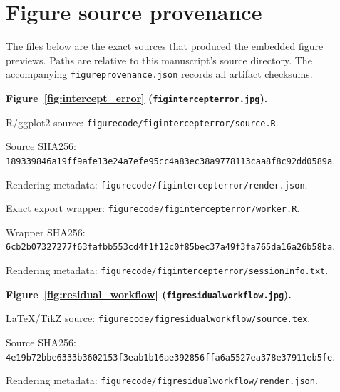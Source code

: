 \documentclass[11pt]{article}
\begin{document}
\section*{Figure source provenance}
The files below are the exact sources that produced the embedded figure previews. Paths are relative to this manuscript's source directory. The accompanying \texttt{figureprovenance.json} records all artifact checksums.\par
\medskip\noindent\textbf{Figure~\ref{fig:intercept_error} (\texttt{figintercepterror.jpg}).}\par
\noindent R/ggplot2 source: \texttt{figurecode/\allowbreak{}figintercepterror/\allowbreak{}source.R}.\par
\noindent Source SHA256: \texttt{18933984\allowbreak{}6a19ff9a\allowbreak{}fe13e24a\allowbreak{}7efe95cc\allowbreak{}4a83ec38\allowbreak{}a9778113\allowbreak{}caa8f8c9\allowbreak{}2dd0589a}.\par
\noindent Rendering metadata: \texttt{figurecode/\allowbreak{}figintercepterror/\allowbreak{}render.json}.\par
\noindent Exact export wrapper: \texttt{figurecode/\allowbreak{}figintercepterror/\allowbreak{}worker.R}.\par
\noindent Wrapper SHA256: \texttt{6cb2b073\allowbreak{}27277f63\allowbreak{}fafbb553\allowbreak{}cd4f1f12\allowbreak{}c0f85bec\allowbreak{}37a49f3f\allowbreak{}a765da16\allowbreak{}a26b58ba}.\par
\noindent Rendering metadata: \texttt{figurecode/\allowbreak{}figintercepterror/\allowbreak{}sessionInfo.txt}.\par
\medskip\noindent\textbf{Figure~\ref{fig:residual_workflow} (\texttt{figresidualworkflow.jpg}).}\par
\noindent LaTeX/TikZ source: \texttt{figurecode/\allowbreak{}figresidualworkflow/\allowbreak{}source.tex}.\par
\noindent Source SHA256: \texttt{4e19b72b\allowbreak{}be6333b3\allowbreak{}602153f3\allowbreak{}eab1b16a\allowbreak{}e392856f\allowbreak{}fa6a5527\allowbreak{}ea378e37\allowbreak{}911eb5fe}.\par
\noindent Rendering metadata: \texttt{figurecode/\allowbreak{}figresidualworkflow/\allowbreak{}render.json}.\par
\end{document}
